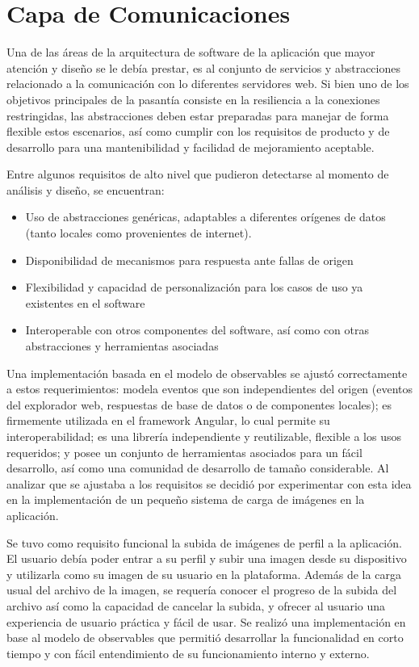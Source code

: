 \section{Capa de Comunicaciones}

Una de las áreas de la arquitectura de software de la aplicación que mayor atención y diseño se le debía prestar, es al conjunto de servicios y abstracciones relacionado a la comunicación con lo diferentes servidores web. Si bien uno de los objetivos principales de la pasantía consiste en la resiliencia a la conexiones restringidas, las abstracciones deben estar preparadas para manejar de forma flexible estos escenarios, así como cumplir con los requisitos de producto y de desarrollo para una mantenibilidad y facilidad de mejoramiento aceptable.

Entre algunos requisitos de alto nivel que pudieron detectarse al momento de análisis y diseño, se encuentran:

\begin{itemize}
  \item Uso de abstracciones genéricas, adaptables a diferentes orígenes de datos (tanto locales como provenientes de internet).
  \item Disponibilidad de mecanismos para respuesta ante fallas de origen
  \item Flexibilidad y capacidad de personalización para los casos de uso ya existentes en el software
  \item Interoperable con otros componentes del software, así como con otras abstracciones y herramientas asociadas
\end{itemize}

Una implementación basada en el modelo de observables se ajustó correctamente a estos requerimientos: modela eventos que son independientes del origen (eventos del explorador web, respuestas de base de datos o de componentes locales); es firmemente utilizada en el framework Angular, lo cual permite su interoperabilidad; es una librería independiente y reutilizable, flexible a los usos requeridos; y posee un conjunto de herramientas asociados para un fácil desarrollo, así como una comunidad de desarrollo de tamaño considerable. Al analizar que se ajustaba a los requisitos se decidió por experimentar con esta idea en la implementación de un pequeño sistema de carga de imágenes en la aplicación.

Se tuvo como requisito funcional la subida de imágenes de perfil a la aplicación. El usuario debía poder entrar a su perfil y subir una imagen desde su dispositivo y utilizarla como su imagen de su usuario en la plataforma. Además de la carga usual del archivo de la imagen, se requería conocer el progreso de la subida del archivo así como la capacidad de cancelar la subida, y ofrecer al usuario una experiencia de usuario práctica y fácil de usar. Se realizó una implementación en base al modelo de observables que permitió desarrollar la funcionalidad en corto tiempo y con fácil entendimiento de su funcionamiento interno y externo.


